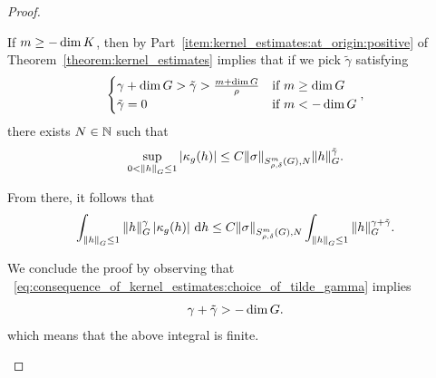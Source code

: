 \begin{proof}
\begin{description}
            If $m \geq -\dim \CompactGroup$,
            then by Part~\eqref{item:kernel_estimates:at_origin:positive} of Theorem~\ref{theorem:kernel_estimates} implies
            that if we pick $\tilde \gamma$ satisfying
            \begin{align}
                \begin{cases}
                    \gamma + \dim \Group > \tilde \gamma > \frac {m + \dim \Group} \rho & \text{if } m \geq \dim \Group\\
                    \tilde \gamma = 0 & \text{if } m < -\dim \Group
                \end{cases},
                \label{eq:consequence_of_kernel_estimates:choice_of_tilde_gamma}
            \end{align}
            there exists $N \in \N$ such that
            \begin{align*}
                \sup_{0 < \norm [\Group] h \leq 1} \abs{\kappa_g(h)}
                \leq
                    C \SymbolSemiNorm m {\rho, \delta} N \sigma \norm [\Group] h^{\tilde \gamma}.
            \end{align*}

            From there, it follows that
            \begin{align*}
                \int_{\norm [\Group] h \leq 1} \norm [\Group] h^\gamma \abs {\kappa_g(h)} \dd h \leq
                C \SymbolSemiNorm m {\rho, \delta} N \sigma
                \int_{\norm [\Group] h \leq 1}
                \norm [\Group] h^{\gamma + \tilde \gamma}.
            \end{align*}

            We conclude the proof by observing that ~\eqref{eq:consequence_of_kernel_estimates:choice_of_tilde_gamma}
            implies
            \begin{align*}
                \gamma + \tilde \gamma > -\dim \Group.
            \end{align*}
            which means that the above integral is finite.
    \end{description}
\end{proof}

